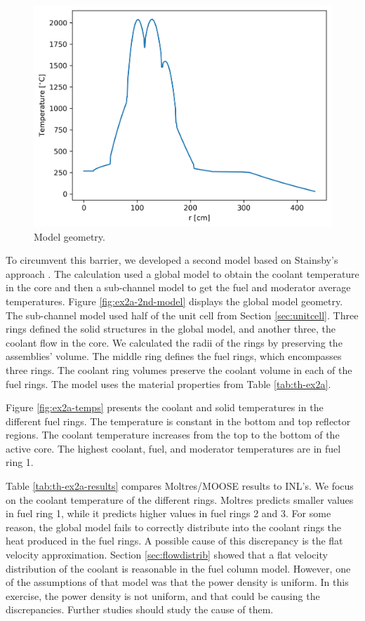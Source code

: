 \begin{figure}[htbp!]
  \centering
  \includegraphics[width=0.35\linewidth]{figures-thermal/ex2a-across}
  \hfill
  \caption{Model geometry.}
  \label{fig:ex2a-1st-model-across}
\end{figure}

To circumvent this barrier, we developed a second model based on Stainsby's approach \cite{stainsby_investigation_2008}.
The calculation used a global model to obtain the coolant temperature in the core and then a sub-channel model to get the fuel and moderator average temperatures.
Figure \ref{fig:ex2a-2nd-model} displays the global model geometry.
The sub-channel model used half of the unit cell from Section \ref{sec:unitcell}.
Three rings defined the solid structures in the global model, and another three, the coolant flow in the core.
We calculated the radii of the rings by preserving the assemblies' volume.
The middle ring defines the fuel rings, which encompasses three rings.
The coolant ring volumes preserve the coolant volume in each of the fuel rings.
The model uses the material properties from Table \ref{tab:th-ex2a}.

Figure \ref{fig:ex2a-temps} presents the coolant and solid temperatures in the different fuel rings.
The temperature is constant in the bottom and top reflector regions.
The coolant temperature increases from the top to the bottom of the active core.
The highest coolant, fuel, and moderator temperatures are in fuel ring 1.

Table \ref{tab:th-ex2a-results} compares Moltres/MOOSE results to INL's.
We focus on the coolant temperature of the different rings.
Moltres predicts smaller values in fuel ring 1, while it predicts higher values in fuel rings 2 and 3.
For some reason, the global model fails to correctly distribute into the coolant rings the heat produced in the fuel rings.
A possible cause of this discrepancy is the flat velocity approximation.
Section \ref{sec:flowdistrib} showed that a flat velocity distribution of the coolant is reasonable in the fuel column model.
However, one of the assumptions of that model was that the power density is uniform.
In this exercise, the power density is not uniform, and that could be causing the discrepancies.
Further studies should study the cause of them.

